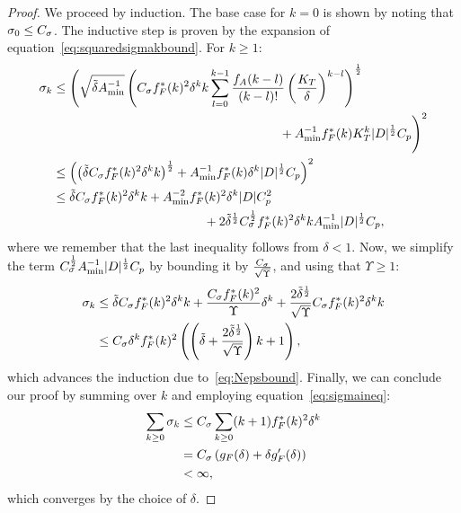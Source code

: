 \begin{proof}
	We proceed by induction.
	The base case for $k=0$ is shown by noting that $\sigma_0 \leq C_{\sigma}$.
	The inductive step is proven by the expansion of equation~\eqref{eq:squaredsigmakbound}.
	For $k\geq 1$:
	\begin{align*}
		\sigma_k &\leq       \Bigg( \sqrt{ {\tilde{\delta}} A_{\min}^{-1}}  \left( C_{\sigma} f^*_F(k)^2\delta^k k  \sum_{l=0}^{k-1}\frac{f_A(k-l)}{(k-l)!} \left(\frac{K_T }{\delta}\right)^{k-l} \right)^{\frac{1}{2}} \\&\qquad\qquad\qquad\qquad\qquad\qquad\qquad\qquad\qquad+ A_{\min}^{-1} f^*_F(k) K_T^k   |D|^{\frac{1}{2}}   C_p   \Bigg)^2\nonumber\\
		&\leq    \left(    \left( {\tilde{\delta}}C_{\sigma} f^*_F(k)^2\delta^k k\right)^\frac{1}{2} +  A_{\min}^{-1} f^*_F(k) \delta^k   |D|^{\frac{1}{2}}   C_p   \right)^2\\
		&\leq  {\tilde{\delta}}  C_{\sigma} f^*_F(k)^2\delta^k k +A_{\min}^{-2} f^*_F(k)^2 \delta^{k} |D|C_p^2 \\
		&\qquad\qquad\qquad\qquad\qquad\qquad+ 2 {\tilde{\delta}}^{\frac{1}{2}} C_{\sigma}^\frac{1}{2}f^*_F(k)^2   \delta^k k A_{\min}^{-1}   |D|^\frac{1}{2}C_p,
	\end{align*}
	where we remember that the last inequality follows from $\delta<1$.
	Now, we simplify the term $C_{\sigma}^\frac{1}{2} A_{\min}^{-1}   |D|^\frac{1}{2}C_p$ by bounding it by $\frac{C_{\sigma}}{\sqrt{\Upsilon}}$, and using that $\Upsilon \geq 1$:
	\begin{align*}
		\sigma_k &\leq  {\tilde{\delta}}  C_{\sigma} f^*_F(k)^2\delta^k k + \frac{C_{\sigma} f^*_F(k)^2}{\Upsilon} \delta^{k} + \frac{2{\tilde{\delta}}^{\frac{1}{2}} }{\sqrt{\Upsilon}} C_{\sigma} f^*_F(k)^2\delta^k k \\
		&\leq  C_{\sigma} \delta^k f^*_F(k)^2\left( \left({\tilde{\delta}} + \frac{2{\tilde{\delta}}^{\frac{1}{2}} }{\sqrt{\Upsilon}} \right)k+1\right),
	\end{align*}
	which advances the induction due to~\eqref{eq:Nepsbound}.
	Finally, we can conclude our proof by summing over $k$ and employing equation~\eqref{eq:sigmaineq}:
	\begin{align*}
		\sum_{k\geq 0} \sigma_k &\leq C_{\sigma}  \sum_{k\geq0}(k+1) f^*_F(k)^2\delta^k \\&=C_{\sigma} \left(g_F(\delta)+\delta g_F'(\delta) \right)\\&< \infty,
	\end{align*}
	which converges by the choice of $\delta$.
\end{proof}

